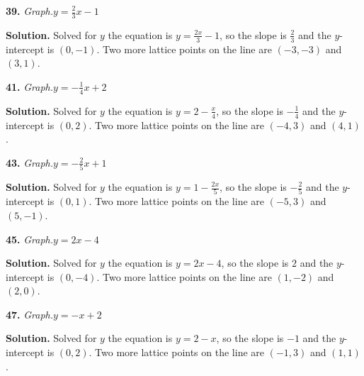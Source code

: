 \documentclass{ximera}
\begin{document}
\begin{problem}
\textbf{39.} \emph{Graph.}\quad $y = \frac{2}{3}x - 1$ \figbox{\gridsm}

\begin{hint}
\textbf{Solution.} Solved for $y$ the equation is $y=\frac{2x}{3} - 1$, so the slope is $\frac{2}{3}$ and the $y$-intercept is $(0,-1)$. Two more lattice points on the line are $(-3,-3)$ and $(3,1)$.
\end{hint}
\end{problem}

\begin{problem}
\textbf{41.} \emph{Graph.}\quad $y = -\frac{1}{4}x + 2$ \figbox{\gridsm}

\begin{hint}
\textbf{Solution.} Solved for $y$ the equation is $y=2 -\frac{x}{4}$, so the slope is $-\frac{1}{4}$ and the $y$-intercept is $(0,2)$. Two more lattice points on the line are $(-4,3)$ and $(4,1)$.
\end{hint}
\end{problem}

\begin{problem}
\textbf{43.} \emph{Graph.}\quad $y = -\frac{2}{5}x + 1$ \figbox{\gridsm}

\begin{hint}
\textbf{Solution.} Solved for $y$ the equation is $y=1 -\frac{2x}{5}$, so the slope is $-\frac{2}{5}$ and the $y$-intercept is $(0,1)$. Two more lattice points on the line are $(-5,3)$ and $(5,-1)$.
\end{hint}
\end{problem}

\begin{problem}
\textbf{45.} \emph{Graph.}\quad $y = 2x - 4$        \figbox{\gridsm}

\begin{hint}
\textbf{Solution.} Solved for $y$ the equation is $y=2x - 4$, so the slope is $2$ and the $y$-intercept is $(0,-4)$. Two more lattice points on the line are $(1,-2)$ and $(2,0)$.
\end{hint}
\end{problem}

\begin{problem}
\textbf{47.} \emph{Graph.}\quad $y = -x + 2$        \figbox{\gridsm}

\begin{hint}
\textbf{Solution.} Solved for $y$ the equation is $y=2 - x$, so the slope is $-1$ and the $y$-intercept is $(0,2)$. Two more lattice points on the line are $(-1,3)$ and $(1,1)$.
\end{hint}
\end{problem}
\end{document}
